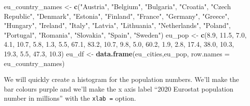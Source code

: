 \documentclass[]{book}
\newenvironment{Shaded}{\begin{snugshade}}{\end{snugshade}}
\newcommand{\KeywordTok}[1]{\textcolor[rgb]{0.13,0.29,0.53}{\textbf{#1}}}
\newcommand{\DataTypeTok}[1]{\textcolor[rgb]{0.13,0.29,0.53}{#1}}
\newcommand{\FloatTok}[1]{\textcolor[rgb]{0.00,0.00,0.81}{#1}}
\newcommand{\StringTok}[1]{\textcolor[rgb]{0.31,0.60,0.02}{#1}}
\newcommand{\OperatorTok}[1]{\textcolor[rgb]{0.81,0.36,0.00}{\textbf{#1}}}
\newcommand{\NormalTok}[1]{#1}
\begin{document}
\begin{Shaded}
\begin{Highlighting}[]
\NormalTok{eu_country_names <-}\StringTok{ }\KeywordTok{c}\NormalTok{(}\StringTok{"Austria"}\NormalTok{, }\StringTok{"Belgium"}\NormalTok{, }\StringTok{"Bulgaria"}\NormalTok{, }\StringTok{"Croatia"}\NormalTok{, }\StringTok{"Czech Republic"}\NormalTok{, }
                      \StringTok{"Denmark"}\NormalTok{, }\StringTok{"Estonia"}\NormalTok{, }\StringTok{"Finland"}\NormalTok{, }\StringTok{"France"}\NormalTok{, }\StringTok{"Germany"}\NormalTok{, }
                      \StringTok{"Greece"}\NormalTok{, }\StringTok{"Hungary"}\NormalTok{, }\StringTok{"Ireland"}\NormalTok{, }\StringTok{"Italy"}\NormalTok{, }\StringTok{"Latvia"}\NormalTok{, }
                      \StringTok{"Lithuania"}\NormalTok{, }\StringTok{"Netherlands"}\NormalTok{, }\StringTok{"Poland"}\NormalTok{, }\StringTok{"Portugal"}\NormalTok{, }\StringTok{"Romania"}\NormalTok{, }
                      \StringTok{"Slovakia"}\NormalTok{, }\StringTok{"Spain"}\NormalTok{, }\StringTok{"Sweden"}\NormalTok{)}
\NormalTok{eu_pop <-}\StringTok{ }\KeywordTok{c}\NormalTok{(}\FloatTok{8.9}\NormalTok{, }\FloatTok{11.5}\NormalTok{, }\FloatTok{7.0}\NormalTok{, }\FloatTok{4.1}\NormalTok{, }\FloatTok{10.7}\NormalTok{,}
            \FloatTok{5.8}\NormalTok{, }\FloatTok{1.3}\NormalTok{, }\FloatTok{5.5}\NormalTok{, }\FloatTok{67.1}\NormalTok{, }\FloatTok{83.2}\NormalTok{,}
            \FloatTok{10.7}\NormalTok{, }\FloatTok{9.8}\NormalTok{, }\FloatTok{5.0}\NormalTok{, }\FloatTok{60.2}\NormalTok{, }\FloatTok{1.9}\NormalTok{,}
            \FloatTok{2.8}\NormalTok{, }\FloatTok{17.4}\NormalTok{, }\FloatTok{38.0}\NormalTok{, }\FloatTok{10.3}\NormalTok{, }\FloatTok{19.3}\NormalTok{,}
            \FloatTok{5.5}\NormalTok{, }\FloatTok{47.3}\NormalTok{, }\FloatTok{10.3}\NormalTok{)}
\NormalTok{eu_df <-}\StringTok{ }\KeywordTok{data.frame}\NormalTok{(eu_cities,eu_pop,}
                    \DataTypeTok{row.names =}\NormalTok{ eu_country_names)}
\end{Highlighting}
\end{Shaded}

We will quickly create a histogram for the population numbers. We'll
make the bar colours purple and we'll make the x axis label ``2020
Eurostat population number in millions'' with the \texttt{xlab\ =}
option.

\begin{Shaded}
\end{Shaded}
\end{document}
